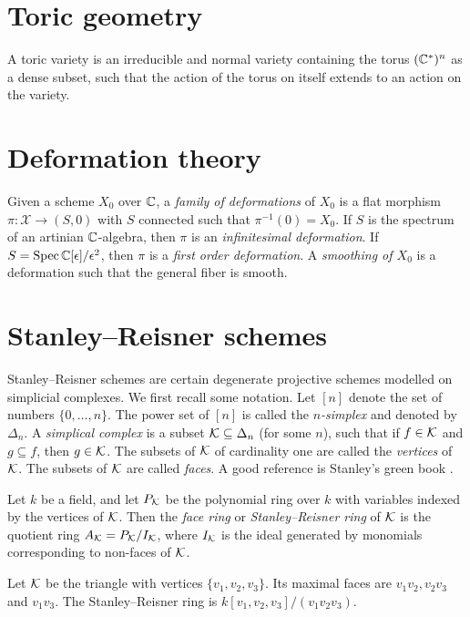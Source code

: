 \section{Toric geometry} %
\label{sec:toric_geometry}

A toric variety is an irreducible and normal variety containing the torus $(\mathbb{C}^\ast)^n$  as a dense subset, such that the action of the torus on itself extends to an action on the variety.


\section{Deformation theory}

Given a scheme $X_0$ over $\mathbb{C}$, a \emph{family of deformations} of $X_0$ is a flat morphism $\pi:\mathscr X \to (S,0)$ with $S$ connected such that $\pi^{-1}(0)=X_0$. If $S$ is the spectrum of an artinian $\mathbb{C}$-algebra, then $\pi$ is an \emph{infinitesimal deformation}. If $S=\operatorname{Spec} \mathbb{C}[\epsilon]/\epsilon^2$, then  $\pi$ is a \emph{first order deformation}. A \emph{smoothing of $X_0$} is a deformation such that the general fiber is smooth.

\section{Stanley--Reisner schemes}

Stanley--Reisner schemes are certain degenerate projective schemes modelled on simplicial complexes. We first recall some notation.  Let $[n]$ denote the set of numbers $\{0,\ldots,n \}$. The power set of $[n]$ is called the \emph{$n$-simplex} and denoted by $\Delta_n$. A \emph{simplical complex} is a subset $\mathcal{K} \subseteq \Delta_n$ (for some $n$), such that if $f \in \mathcal{K}$ and $g \subseteq f$, then $g \in \mathcal{K}$. The subsets of $\mathcal{K}$ of cardinality one are called the \emph{vertices} of $\mathcal{K}$. The subsets of $\mathcal{K}$ are called \emph{faces}. A good reference is Stanley's green book \cite{stanley_green}.

Let $k$ be a field, and let $P_{\mathcal{K}}$ be the polynomial ring over $k$ with variables indexed by the vertices of $\mathcal{K}$. Then the \emph{face ring} or \emph{Stanley--Reisner ring} of $\mathcal{K}$ is the quotient ring $A_{\mathcal{K}} = P_{\mathcal{K}}/I_{\mathcal{K}}$, where $I_{\mathcal{K}}$ is the ideal generated by monomials corresponding to non-faces of $\mathcal{K}$. 

\begin{example}
Let $\mathcal{K}$ be the triangle with vertices $\{ v_1,v_2,v_3\}$. Its maximal faces are $v_1v_2, v_2v_3$ and $v_1v_3$. The Stanley--Reisner ring is $k[v_1,v_2,v_3]/(v_1v_2v_3)$.
\end{example}

